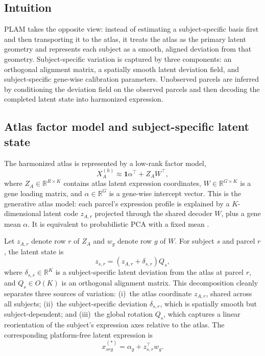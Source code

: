 \documentclass[11pt]{article}
\numberwithin{equation}{section}
\begin{document}
\subsection{Intuition}
PLAM takes the opposite view: instead of estimating a
subject-specific basis first and then transporting it to the atlas, it treats the atlas
as the primary latent geometry and represents each subject as a smooth, aligned
deviation from that geometry.  Subject-specific variation is captured by three
components: an orthogonal alignment matrix, a spatially smooth latent deviation field,
and subject-specific gene-wise calibration parameters.  Unobserved parcels are inferred
by conditioning the deviation field on the observed parcels and then decoding the
completed latent state into harmonized expression.

\subsection{Atlas factor model and subject-specific latent state}
The harmonized atlas is represented by a low-rank factor model,
\begin{equation}
  \label{eq:prob-atlas-factor}
  X_A^{(h)} \approx \mathbf{1}\alpha^\top + Z_A W^\top,
\end{equation}
where $Z_A\in\mathbb{R}^{R\times K}$ contains atlas latent expression coordinates,
$W\in\mathbb{R}^{G\times K}$ is a gene loading matrix, and $\alpha\in\mathbb{R}^G$ is
a gene-wise intercept vector.  This is the generative atlas model: each parcel's
expression profile is explained by a $K$-dimensional latent code $z_{A,r}$ projected
through the shared decoder $W$, plus a gene mean $\alpha$.  It is equivalent to
probabilistic PCA with a fixed mean \cite{tipping1999ppca}.

Let $z_{A,r}$ denote row $r$ of $Z_A$ and $w_g$ denote row $g$ of $W$.  For subject
$s$ and parcel $r$, the latent state is
\begin{equation}
  \label{eq:prob-latent-state}
  z_{s,r} = \left(z_{A,r} + \delta_{s,r}\right)Q_s,
\end{equation}
where $\delta_{s,r}\in\mathbb{R}^K$ is a subject-specific latent deviation from the
atlas at parcel $r$, and $Q_s\in O(K)$ is an orthogonal alignment matrix.  This
decomposition cleanly separates three sources of variation: (i)~the atlas coordinate
$z_{A,r}$, shared across all subjects; (ii)~the subject-specific deviation
$\delta_{s,r}$, which is spatially smooth but subject-dependent; and (iii)~the global
rotation $Q_s$, which captures a linear reorientation of the subject's expression axes
relative to the atlas.  The corresponding platform-free latent expression is
\begin{equation}
  \label{eq:prob-latent-expression}
  x_{srg}^{(*)} = \alpha_g + z_{s,r}^\top w_g.
\end{equation}
\end{document}
